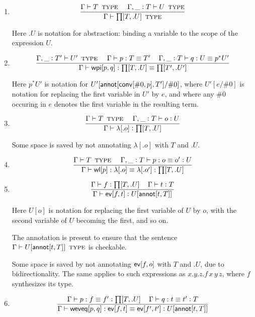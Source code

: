 \documentclass[11pt]{article}
\newcommand{\eqd}{\equiv}
\newcommand{\spc}{{\,\,\,\,\,\,\,}}
\newcommand{\ccolon}[1]{\vcentcolon#1}
\newcommand{\ccheck}[1]{\vcentcolon#1}  %
\newcommand{\synth}[1]{\vcentcolon(\Rightarrow#1)} %
\renewcommand{\synth}[1]{\ccheck#1} %
\newcommand{\Type}{\mathop{\text{ \sc type}}}
\newcommand{\ha}[2]{#1[#2]}
\newcommand{\annot}{{\sf annot}}
\newcommand{\conv}{{\sf conv}}
\newcommand{\ev}{{\sf ev}}
\newcommand{\weveq}{{\sf weveq}}
\newcommand{\wl}{{\sf wl}}
\newcommand{\wpi}{{\sf wpi}}
\newcommand{\var}{\char`_}
\begin{document}
\begin{enumerate}

\item 
\[\frac{\Gamma \vdash T \Type \spc \Gamma, \var \ccolon{T}\vdash U\Type}{\Gamma\vdash \ha\prod{T,.U}\Type}\]

Here $.U$ is notation for abstraction: binding a variable to the scope of the expression $U$.

\item 
\[ \frac{ 
  \Gamma, \var \ccolon{T'} \vdash U'  \Type      \spc 
  \Gamma     \vdash p:T \eqd T'    \spc
  \Gamma,  \var \ccolon{T}  \vdash q:U \eqd p^*U'
  } {
  \Gamma     \vdash \ha\wpi{p,q}:\ha\prod{T,.U}\eqd \ha\prod{T',.U'}
}\]

Here ${p}^*U'$ is notation for $U'[\ha\annot{\ha\conv{\#0,p},T'}/\#0]$, where
$U'[e/\#0]$ is notation for replacing the first variable in $U'$ by $e$, and
where any $\#0$ occuring in $e$ denotes the first variable in the resulting
term.

\item 
\[\frac{\Gamma \vdash T \Type \spc \Gamma, \var \ccolon{T}\vdash o \ccheck{U}}{\Gamma\vdash \ha\lambda{.o} \ccheck{\ha\prod{T,.U}}}\]

Some space is saved by not annotating $\ha\lambda{.o}$ with $T$ and $.U$.

\item 
\[\frac{\Gamma \vdash T \Type \spc \Gamma, \var \ccolon{T}\vdash p : o\eqd o' \ccheck{U}}{\Gamma\vdash \ha\wl{p} : \ha\lambda{.o}\eqd \ha\lambda{.o'} : \ha\prod{T,.U}}\]

\item 
\[\frac{\Gamma\vdash f \ccolon{\ha\prod{T,.U}}\spc \Gamma\vdash t \ccheck{T}}{\Gamma\vdash \ha\ev{f,t} \synth{U[\ha\annot{t,T}]}}\]

Here $U[o]$ is notation for replacing the first variable of $U$ by $o$, with
the second variable of $U$ becoming the first, and so on.  

The annotation is present to ensure that the sentence $\Gamma \vdash
U[\ha\annot{t,T}] \Type$ is checkable.

Some space is saved by not annotating $\ha\ev{f,o}$ with $T$ and $.U$, due to
bidirectionality.  The same applies to such expressions as $x.y.z.f\, x\, y\,
z$, where $f$ synthesizes its type.

\item 
\[\frac{
   \Gamma\vdash p : f \eqd f' \synth{\ha\prod{T,.U}}\spc 
   \Gamma\vdash q : t \eqd t' \ccheck{T}
   }{
   \Gamma\vdash \ha\weveq{p,q} : \ha\ev{f,t} \eqd \ha\ev{f',t'} \synth{U[\ha\annot{t,T}]}
  }\]


\end{enumerate}
\end{document}
